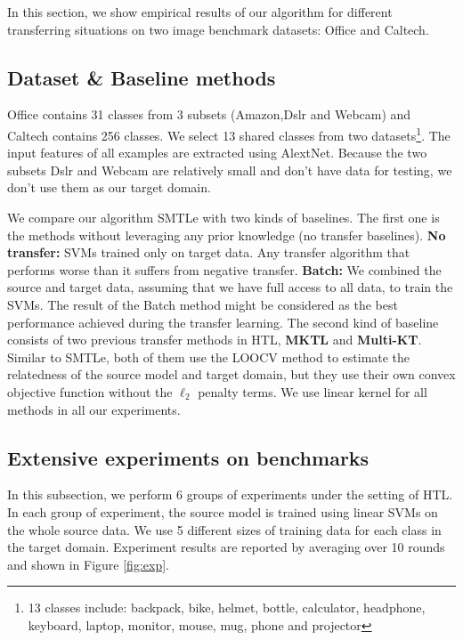 In this section, we show empirical results of our algorithm for different transferring situations on two image benchmark datasets: Office and Caltech.
\subsection{Dataset \& Baseline methods}
Office contains 31 classes from 3 subsets (Amazon,Dslr and Webcam) and Caltech contains 256 classes. We select 13 shared classes from two datasets\footnote{13 classes include: backpack, bike, helmet, bottle, calculator, headphone, keyboard, laptop, monitor, mouse, mug, phone and projector}. The input features of all examples are extracted using AlextNet\cite{krizhevsky2012imagenet}.
Because the two subsets Dslr and Webcam are relatively small and don't have data for testing, we don't use them as our target domain.

We compare our algorithm SMTLe with two kinds of baselines. The first one is the methods without leveraging any prior knowledge (no transfer baselines). \textbf{No transfer:} SVMs trained only on target data. Any transfer algorithm that performs worse than it suffers from negative transfer. \textbf{Batch:} We combined the source and target data, assuming that we have full access to all data, to train the SVMs. The result of the Batch method might be considered as the best performance achieved during the transfer learning. The second kind of baseline consists of two previous transfer methods in HTL, \textbf{MKTL\cite{jie2011multiclass}} and \textbf{Multi-KT\cite{tommasi2014learning}}. Similar to SMTLe, both of them use the LOOCV method to estimate the relatedness of the source model and target domain, but they use their own convex objective function without the $\ell_2$ penalty terms. We use linear kernel for all methods in all our experiments.
\subsection{Extensive experiments on benchmarks}
In this subsection, we perform 6 groups of experiments under the setting of HTL. In each group of experiment, the source model is trained using linear SVMs on the whole source data. We use 5 different sizes of training data for each class in the target domain. Experiment results are reported by averaging over 10 rounds and shown in Figure \ref{fig:exp}. 


